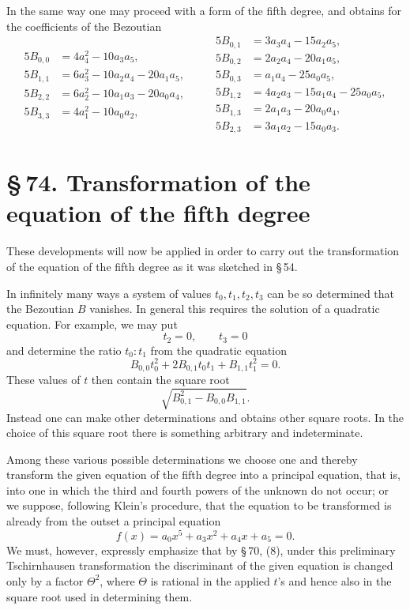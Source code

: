 \documentclass[11pt]{article}
\providecommand{\sect}[2]{\section*{\S\,#1. #2}}
\begin{document}
In the same way one may proceed with a form of the fifth degree, and obtains for the coefficients of the Bezoutian
\[
\begin{aligned}
5B_{0,0}&=4a_4^2-10a_3a_5,\\
5B_{1,1}&=6a_3^2-10a_2a_4-20a_1a_5,\\
5B_{2,2}&=6a_2^2-10a_1a_3-20a_0a_4,\\
5B_{3,3}&=4a_1^2-10a_0a_2,
\end{aligned}\qquad
\begin{aligned}
5B_{0,1}&=3a_3a_4-15a_2a_5,\\
5B_{0,2}&=2a_2a_4-20a_1a_5,\\
5B_{0,3}&=a_1a_4-25a_0a_5,\\
5B_{1,2}&=4a_2a_3-15a_1a_4-25a_0a_5,\\
5B_{1,3}&=2a_1a_3-20a_0a_4,\\
5B_{2,3}&=3a_1a_2-15a_0a_3.
\end{aligned}
\]

\sect{74}{Transformation of the equation of the fifth degree}

These developments will now be applied in order to carry out the transformation of the equation of the fifth degree as it was sketched in \S\,54.

In infinitely many ways a system of values $t_0,t_1,t_2,t_3$ can be so determined that the Bezoutian $B$ vanishes. In general this requires the solution of a quadratic equation. For example, we may put
\[
 t_2=0,
 \qquad t_3=0
\]
and determine the ratio $t_0:t_1$ from the quadratic equation
\[
 B_{0,0}t_0^2+2B_{0,1}t_0t_1+B_{1,1}t_1^2=0.
\]
These values of $t$ then contain the square root
\[
 \sqrt{B_{0,1}^2-B_{0,0}B_{1,1}}.
\]
Instead one can make other determinations and obtains other square roots. In the choice of this square root there is something arbitrary and indeterminate.

Among these various possible determinations we choose one and thereby transform the given equation of the fifth degree into a principal equation, that is, into one in which the third and fourth powers of the unknown do not occur; or we suppose, following Klein's procedure, that the equation to be transformed is already from the outset a principal equation
\begin{equation}
 f(x)=a_0x^5+a_3x^2+a_4x+a_5=0.
\tag{1}
\end{equation}
We must, however, expressly emphasize that by \S\,70, (8), under this preliminary Tschirnhausen transformation the discriminant of the given equation is changed only by a factor $\Theta^2$, where $\Theta$ is rational in the applied $t$'s and hence also in the square root used in determining them.
\end{document}
